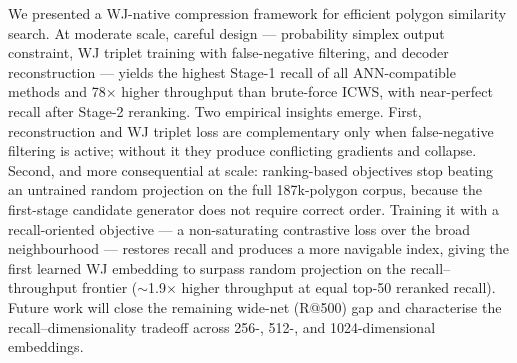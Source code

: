 \documentclass[sigconf]{acmart}
\begin{document}
We presented a WJ-native compression framework for efficient polygon similarity
search. At moderate scale, careful design --- probability simplex output constraint,
WJ triplet training with false-negative filtering, and decoder reconstruction ---
yields the highest Stage-1 recall of all ANN-compatible methods and 78$\times$ higher
throughput than brute-force ICWS, with near-perfect recall after Stage-2 reranking.
Two empirical insights emerge. First, reconstruction and WJ triplet loss are
complementary only when false-negative filtering is active; without it they produce
conflicting gradients and collapse. Second, and more consequential at scale:
ranking-based objectives stop beating an untrained random projection on the full
187k-polygon corpus, because the first-stage candidate generator does not require
correct order. Training it with a recall-oriented objective --- a non-saturating
contrastive loss over the broad neighbourhood --- restores recall and produces a
more navigable index, giving the first learned WJ embedding to surpass random
projection on the recall--throughput frontier ($\sim$1.9$\times$ higher throughput at
equal top-50 reranked recall). Future work will close the remaining wide-net (R@500)
gap and characterise the recall--dimensionality tradeoff across 256-, 512-, and
1024-dimensional embeddings.
\end{document}
